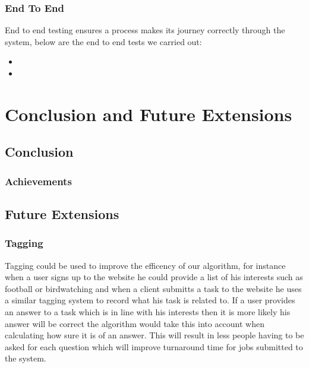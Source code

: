 \documentclass[11pt]{article}
\begin{document}
\subsubsection{End To End}
End to end testing ensures a process makes its journey correctly through the system, below are the end to end tests we carried out:
\begin{itemize}
\item
\item
\end{itemize}


\section{Conclusion and Future Extensions}

\subsection{Conclusion}
\subsubsection{Achievements}
\subsection{Future Extensions}

\subsubsection{Tagging}
Tagging could be used to improve the efficency of our algorithm, for instance when a user signs up to the website he could provide a list of his
interests such as football or birdwatching and when a client submitts a task to the website he uses a similar tagging system to record what his
task is related to. If a user provides an answer to a task which is in line with his interests then it is more likely his answer will be correct
the algorithm would take this into account when calculating how sure it is of an answer. This will result in less people having to be asked 
for each question which will improve turnaround time for jobs submitted to the system. 
\end{document}
